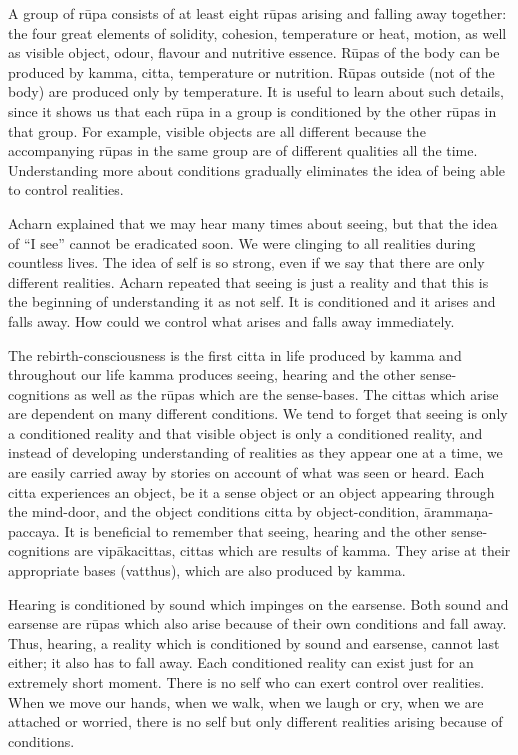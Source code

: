 \documentclass{book}
\begin{document}
A group of rūpa consists of at least eight
rūpas arising and falling away together: the four great elements of
solidity, cohesion, temperature or heat, motion, as well as visible
object, odour, flavour and nutritive essence. Rūpas of the body can be
produced by kamma, citta, temperature or nutrition. Rūpas outside (not
of the body) are produced only by temperature. It is useful to learn
about such details, since it shows us that each rūpa in a group is
conditioned by the other rūpas in that group. For example, visible
objects are all different because the accompanying rūpas in the same
group are of different qualities all the time. Understanding more about
conditions gradually eliminates the idea of being able to control
realities. 

Acharn explained that we
may hear many times about seeing, but that the idea of ``I see'' cannot
be eradicated soon. We were clinging to all realities during countless
lives. The idea of self is so strong,
even if we say that there are only different realities.
Acharn repeated that seeing is just a reality and that this
is the beginning of understanding it as not self. It is conditioned and
it arises and falls away. How could we control what arises and falls
away immediately. 

The rebirth-consciousness is the first citta
in life produced by kamma and throughout our life kamma produces seeing,
hearing and the other sense-cognitions as well as the rūpas which are
the sense-bases. The cittas which arise
are dependent on many different conditions. We tend to forget that
seeing is only a conditioned reality and that visible object is only a
conditioned reality, and instead of developing understanding
of realities as they appear one at a time,
we are easily carried away
by stories on account of what was seen or heard.
Each citta experiences an object, be it
a sense object or an object
appearing through the mind-door, and the
object conditions citta by object-condition,
ārammaṇa-paccaya. It is
beneficial to remember that seeing, hearing and the other
sense-cognitions are
vipākacittas, cittas which
are results of kamma. They arise at their appropriate bases
(vatthus),
which are also produced by kamma. 

Hearing is conditioned
by sound which impinges on the earsense. Both sound and earsense are
rūpas which also arise
because of their own conditions and fall away. Thus, hearing,
a reality which
is conditioned by sound and earsense,
cannot last either; it also has to fall away. Each conditioned reality
can exist just for an extremely short moment.
There is no self who can
exert control over realities. When we move our hands, when we walk, when
we laugh or cry, when we are attached or worried, there is
no self but only different realities arising because of conditions.
\end{document}
